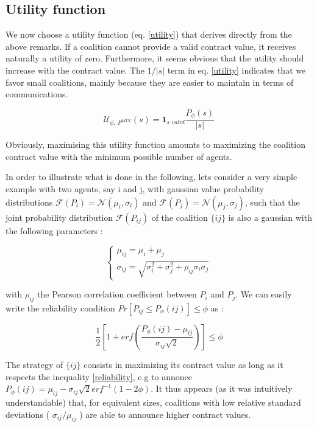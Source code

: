 \documentclass[conference]{IEEEtran}
\begin{document}
\subsection{Utility function}\label{subsec:UtilityFunc}
We now choose a utility function (eq. \ref{utility}) that derives directly from the above remarks. If a coalition cannot provide a valid contract value, it receives naturally a utility of zero. Furthermore, it seems obvious that the utility should increase with the contract value. The $ 1/|s| $ term in eq. \ref{utility} indicates that we favor small coalitions, mainly because they are easier to maintain in terms of communications.

\begin{equation}
 \mathcal{U}_{\phi,\ P^{MIN}}(s) = \mathbf{1}_{\textit{s\ valid}} \dfrac{P_{\phi}(s)}{|s|} 
\label{utility}
\end{equation}

Obviously, maximising this utility function amounts to maximizing the coalition contract value with the minimum possible number of agents. 

In order to illustrate what is done in the following, lets consider a very simple example with two agents, say i and j, with gaussian value probability distributions $ \mathcal{F}(P_{i}) = \mathcal{N}(\mu_{i}, \sigma_{i}) $ and $ \mathcal{F}(P_{j}) = \mathcal{N}(\mu_{j}, \sigma_{j}) $, such that the joint probability distribution  $ \mathcal{F}(P_{ij}) $ of the coalition $\{ij\}$ is also a gaussian with the following parameters :

\begin{equation}
\left\{ \begin{array}{lll}
		\mu_{ij} = \mu_{i} + \mu_{j} \\
		\sigma_{ij} = \sqrt{\sigma_{i}^{2} + \sigma_{j}^{2} + \rho_{ij}\sigma_{i}\sigma_{j}}
\end{array} \right.
\label{parameters}
\end{equation}

with $ \rho_{ij} $ the Pearson correlation coefficient between $ P_{i} $ and $ P_{j} $. We can easily write the reliability condition $ Pr[P_{ij} \leq P_{\phi}(ij) ] \leq \phi $ as :

\begin{equation}
\dfrac{1}{2} \left[ 1+ erf \left( \dfrac{P_{\phi}(ij) - \mu_{ij}}{\sigma_{ij}\sqrt{2}} \right) \right] \leq \phi
\label{reliability}
\end{equation}

The strategy of $ \{ij\} $ consists in maximizing its contract value as long as it respects the inequality \ref{reliability}, e.g to annonce $ P_{\phi}(ij) = \mu_{ij} - \sigma_{ij}\sqrt{2}erf^{-1}(1-2 \phi ) $. It thus appears (as it was intuitively understandable) that, for equivalent sizes, coalitions with low relative standard deviations ( $ \sigma_{ij} / \mu_{ij} $ ) are able to announce higher contract values. 
\end{document}
